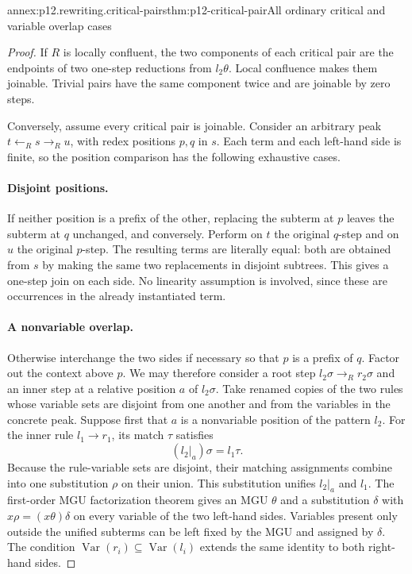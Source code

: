 \begin{annexitem}{annex:p12.rewriting.critical-pairs}{thm:p12-critical-pair}{All ordinary critical and variable overlap cases}
\begin{proof}
If \(R\) is locally confluent, the two components of each critical
pair are the endpoints of two one-step reductions from \(l_2\theta\).
Local confluence makes them joinable. Trivial pairs have the same
component twice and are joinable by zero steps.

Conversely, assume every critical pair is joinable. Consider an arbitrary
peak \(t\leftarrow_R s\to_R u\), with redex positions \(p,q\)
in \(s\). Each term and each left-hand side is finite, so the
position comparison has the following exhaustive cases.

\paragraph{Disjoint positions.}
If neither position is a prefix of the other, replacing the subterm at
\(p\) leaves the subterm at \(q\) unchanged, and conversely.
Perform on \(t\) the original \(q\)-step and on \(u\) the
original \(p\)-step. The resulting terms are literally equal: both
are obtained from \(s\) by making the same two replacements in
disjoint subtrees. This gives a one-step join on each side. No linearity
assumption is involved, since these are occurrences in the already
instantiated term.

\paragraph{A nonvariable overlap.}
Otherwise interchange the two sides if necessary so that \(p\) is
a prefix of \(q\). Factor out the context above \(p\). We may
therefore consider a root step \(l_2\sigma\to_R r_2\sigma\)
and an inner step at a relative position \(a\) of \(l_2\sigma\).
Take renamed copies of the two rules whose variable sets are disjoint
from one another and from the variables in the concrete peak. Suppose
first that \(a\) is a nonvariable position of the pattern \(l_2\).
For the inner rule \(l_1\to r_1\), its match \(\tau\) satisfies
\[
 (l_2|_a)\sigma=l_1\tau.
\]
Because the rule-variable sets are disjoint, their matching assignments
combine into one substitution \(\rho\) on their union. This
substitution unifies \(l_2|_a\) and \(l_1\). The first-order MGU
factorization theorem gives an MGU \(\theta\) and a substitution
\(\delta\) with \(x\rho=(x\theta)\delta\) on every variable
of the two left-hand sides. Variables present only outside the unified
subterms can be left fixed by the MGU and assigned by \(\delta\).
The condition \(\operatorname{Var}(r_i)\subseteq
\operatorname{Var}(l_i)\) extends the same identity to both right-hand
sides.


\end{proof}
\end{annexitem}
